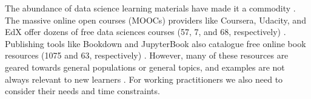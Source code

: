 \documentclass[020-persona\_validation.tex]{subfiles}
\begin{document}


    The abundance of data science learning materials have made it a commodity
    \cite{krossDemocratizationDataScience2020}.
    The massive online open courses (MOOCs) providers like
    Coursera,
    Udacity, and
    EdX
    offer dozens of free data sciences courses
    (57, 7, and 68, respectively)
    \cite{courseraTopFreeCourses, udacityDataScienceOnline, edxDataAnalysisCourses}.
    Publishing tools like Bookdown and
    JupyterBook
    also catalogue free online book resources
    (1075 and 63, respectively)
    \cite{bookdownAllBooksBookdown, executablebookprojectGalleryJupyterBooks}.
    However, many of these resources are geared towards general populations or general topics,
    and examples are not always relevant to new learners
    \cite{krossDemocratizationDataScience2020}.
    For working practitioners we also need to consider their needs and time constraints.
\end{document}
